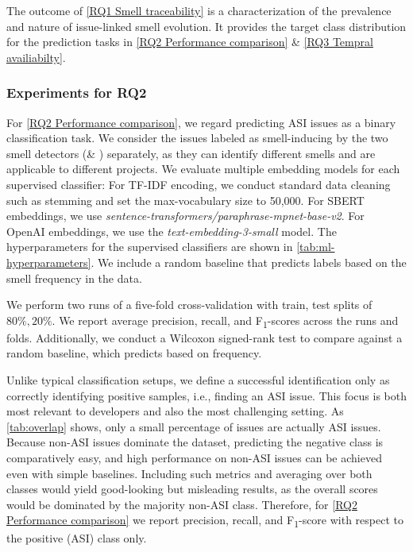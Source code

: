 The outcome of \ref{RQ1 Smell traceability} is a characterization of the prevalence and nature of issue-linked smell evolution.
It provides the target class distribution for the prediction tasks in \ref{RQ2 Performance comparison} \& \ref{RQ3 Tempral availiabilty}.


\subsubsection{Experiments for RQ2}
For \ref{RQ2 Performance comparison}, we regard predicting \acl{ASI} issues as a binary classification task.
We consider the issues labeled as smell-inducing by the two smell detectors (\ARCADE \& \Arcan) separately, as they can identify different smells and are applicable to different projects.
We evaluate multiple embedding models for each supervised classifier:
For TF-IDF encoding, we conduct standard data cleaning such as stemming and set the max-vocabulary size to 50,000.
For \ac{SBERT} embeddings, we use \textit{sentence-transformers/paraphrase-mpnet-base-v2}.
For OpenAI embeddings, we use the \textit{text-embedding-3-small} model.
The hyperparameters for the supervised classifiers are shown in \autoref{tab:ml-hyperparameters}.
We include a random baseline that predicts labels based on the smell frequency in the data.

We perform two runs of a five-fold cross-validation with train, test splits of $80\%, 20\%$.
We report average precision, recall, and F\textsubscript{1}-scores across the runs and folds.
Additionally, we conduct a Wilcoxon signed-rank test to compare against a random baseline, which predicts based on frequency.

Unlike typical classification setups, we define a successful identification only as correctly identifying positive samples, i.e., finding an \ac{ASI} issue.
This focus is both most relevant to developers and also the most challenging setting.
As \autoref{tab:overlap} shows, only a small percentage of issues are actually \ac{ASI} issues.
Because non-\ac{ASI} issues dominate the dataset, predicting the negative class is comparatively easy, and high performance on non-\ac{ASI} issues can be achieved even with simple baselines.
Including such metrics and averaging over both classes would yield good-looking but misleading results, as the overall scores would be dominated by the majority non-\ac{ASI} class.
Therefore, for \ref{RQ2 Performance comparison} we report precision, recall, and F\textsubscript{1}-score with respect to the positive (\ac{ASI}) class only.

